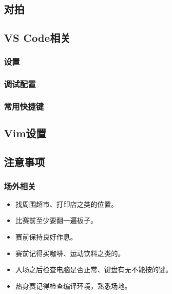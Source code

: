 \documentclass[a4paper, twoside]{article}
\begin{document}
    \subsection{对拍}

    \subsection{VS Code相关}
        \subsubsection{设置}

        \subsubsection{调试配置}

        \subsubsection{常用快捷键}

    \subsection{Vim设置}

    \subsection{注意事项}

        \subsubsection{场外相关}
        \begin{itemize}
            \item 找周围超市、打印店之类的位置。
            \item 比赛前至少要翻一遍板子。
            \item 赛前保持良好作息。
            \item 赛前记得买咖啡、运动饮料之类的。
            \item 入场之后检查电脑是否正常、键盘有无不能按的键。
            \item 热身赛记得检查编译环境，熟悉场地。
        \end{itemize}
\end{document}
